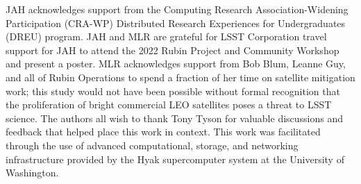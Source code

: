 \documentclass[twocolumn]{aastex631}
\begin{document}

{}


\begin{acknowledgments}
JAH acknowledges support from the Computing Research Association-Widening Participation (CRA-WP) Distributed Research Experiences for Undergraduates (DREU) program.
JAH and MLR are grateful for LSST Corporation travel support for JAH to attend the 2022 Rubin Project and Community Workshop and present a poster.
MLR acknowledges support from Bob Blum, Leanne Guy, and all of Rubin Operations to spend a fraction of her time on satellite mitigation work; this study would not have been possible without formal recognition that the proliferation of bright commercial LEO satellites poses a threat to LSST science.
The authors all wish to thank Tony Tyson for valuable discussions and feedback that helped place this work in context.
This work was facilitated through the use of advanced computational, storage, and networking infrastructure provided by the Hyak supercomputer system at the University of Washington.
\end{acknowledgments}
\end{document}

